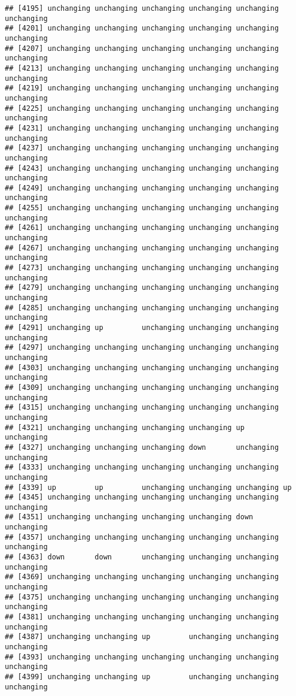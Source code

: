 \documentclass[]{article}
\begin{document}
\begin{verbatim}
## [4195] unchanging unchanging unchanging unchanging unchanging unchanging
## [4201] unchanging unchanging unchanging unchanging unchanging unchanging
## [4207] unchanging unchanging unchanging unchanging unchanging unchanging
## [4213] unchanging unchanging unchanging unchanging unchanging unchanging
## [4219] unchanging unchanging unchanging unchanging unchanging unchanging
## [4225] unchanging unchanging unchanging unchanging unchanging unchanging
## [4231] unchanging unchanging unchanging unchanging unchanging unchanging
## [4237] unchanging unchanging unchanging unchanging unchanging unchanging
## [4243] unchanging unchanging unchanging unchanging unchanging unchanging
## [4249] unchanging unchanging unchanging unchanging unchanging unchanging
## [4255] unchanging unchanging unchanging unchanging unchanging unchanging
## [4261] unchanging unchanging unchanging unchanging unchanging unchanging
## [4267] unchanging unchanging unchanging unchanging unchanging unchanging
## [4273] unchanging unchanging unchanging unchanging unchanging unchanging
## [4279] unchanging unchanging unchanging unchanging unchanging unchanging
## [4285] unchanging unchanging unchanging unchanging unchanging unchanging
## [4291] unchanging up         unchanging unchanging unchanging unchanging
## [4297] unchanging unchanging unchanging unchanging unchanging unchanging
## [4303] unchanging unchanging unchanging unchanging unchanging unchanging
## [4309] unchanging unchanging unchanging unchanging unchanging unchanging
## [4315] unchanging unchanging unchanging unchanging unchanging unchanging
## [4321] unchanging unchanging unchanging unchanging up         unchanging
## [4327] unchanging unchanging unchanging down       unchanging unchanging
## [4333] unchanging unchanging unchanging unchanging unchanging unchanging
## [4339] up         up         unchanging unchanging unchanging up        
## [4345] unchanging unchanging unchanging unchanging unchanging unchanging
## [4351] unchanging unchanging unchanging unchanging down       unchanging
## [4357] unchanging unchanging unchanging unchanging unchanging unchanging
## [4363] down       down       unchanging unchanging unchanging unchanging
## [4369] unchanging unchanging unchanging unchanging unchanging unchanging
## [4375] unchanging unchanging unchanging unchanging unchanging unchanging
## [4381] unchanging unchanging unchanging unchanging unchanging unchanging
## [4387] unchanging unchanging up         unchanging unchanging unchanging
## [4393] unchanging unchanging unchanging unchanging unchanging unchanging
## [4399] unchanging unchanging up         unchanging unchanging unchanging

\end{verbatim}
\end{document}
